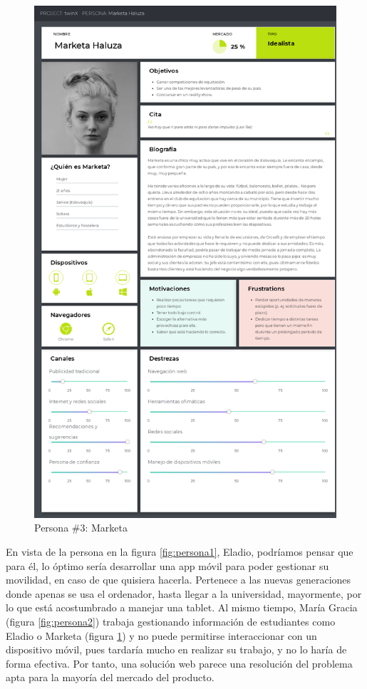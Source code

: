 \begin{figure}
	\centering
	\includegraphics[width=\textwidth, height=\textheight, keepaspectratio]{img/Personas/Marketa}
	\caption[Persona \#3]{Persona \#3: Marketa}
	\label{fig:persona3}
\end{figure}

En vista de la persona en la figura \ref{fig:persona1}, Eladio, podríamos pensar que para él, lo óptimo sería desarrollar una app móvil para poder gestionar su movilidad, en caso de que quisiera hacerla. Pertenece a las nuevas generaciones donde apenas se usa el ordenador, hasta llegar a la universidad, mayormente, por lo que está acostumbrado a manejar una tablet. Al mismo tiempo, María Gracia (figura \ref{fig:persona2}) trabaja gestionando información de estudiantes como Eladio o Marketa (figura \ref{fig:persona3}) y no puede permitirse interaccionar con un dispositivo móvil, pues tardaría mucho en realizar su trabajo, y no lo haría de forma efectiva. Por tanto, una solución web parece una resolución del problema apta para la mayoría del mercado del producto.


